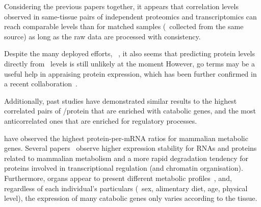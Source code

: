 Considering the previous papers together,
it appears that
correlation levels observed in same-tissue pairs
of independent proteomics and transcriptomics
can reach comparable levels than for matched samples
(\ie\ collected from the same source)
as long as the raw data are processed with consistency.\mybr\

Despite the many deployed efforts,
\eg\ \citet{Franks2017-bp,Eraslan2019-md},
it also seems that predicting protein levels directly from \mRNA\ levels
is still unlikely at the moment
However, \gls{go} terms may be a useful help in appraising protein expression,
which has been further confirmed in a recent collaboration~.

Additionally, past studies have demonstrated similar results to
the highest correlated pairs of \mRNA/protein
that are enriched with catabolic genes,
and the most anticorrelated ones that are enriched for regulatory processes.

\citet{Vogel2010-ux} have observed the highest protein-per-mRNA ratios
for mammalian metabolic genes.
Several papers~
observe higher expression stability for
\glspl{RNA} and proteins related to mammalian metabolism
and a more rapid degradation tendency
for proteins involved in transcriptional regulation (and chromatin organisation).
Furthermore, organs appear to present
different metabolic profiles~,
and, regardless of each individual's particulars
(\eg\ sex, alimentary diet, age, physical level),
the expression of many catabolic genes only varies according to the tissue.\mybr\

